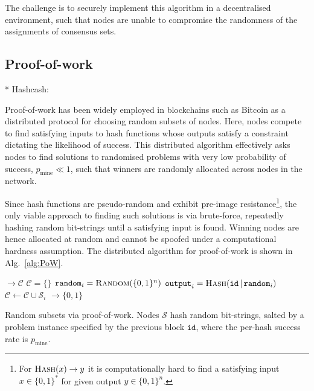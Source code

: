 \documentclass[twocolumn, aps, amsmath, amssymb, nofootinbib, superscriptaddress, longbibliography, floatfix, eqsecnum, rmp]{revtex4-2}
\let\oldalgorithmic\algorithmic
\let\endoldalgorithmic\endalgorithmic
\renewenvironment{algorithmic}
{\begin{adjustwidth}{-1em}{}\oldalgorithmic}
{\endoldalgorithmic\end{adjustwidth}}
\begin{document}
The challenge is to securely implement this algorithm in a decentralised environment, such that nodes are unable to compromise the randomness of the assignments of consensus sets.

\subsection{Proof-of-work} \label{sec:PoW}

* Hashcash: \cite{pow_email, hashcash}

Proof-of-work has been widely employed in blockchains such as Bitcoin \cite{Nakamoto08} as a distributed protocol for choosing random subsets of nodes. Here, nodes compete to find satisfying inputs to hash functions whose outputs satisfy a constraint dictating the likelihood of success. This distributed algorithm effectively asks nodes to find solutions to randomised problems with very low probability of success, $p_\mathrm{mine}\ll 1$, such that winners are randomly allocated across nodes in the network.

Since hash functions are pseudo-random and exhibit pre-image resistance\footnote{For $\textsc{Hash}(x)\to y$ it is computationally hard to find a satisfying input $x\in\{0,1\}^*$ for given output $y\in\{0,1\}^n$.}, the only viable approach to finding such solutions is via brute-force, repeatedly hashing random bit-strings until a satisfying input is found. Winning nodes are hence allocated at random and cannot be spoofed under a computational hardness assumption. The distributed algorithm for proof-of-work is shown in Alg.~\ref{alg:PoW}.

\begin{algorithm}[H]
\begin{algorithmic}
 $\to \mathcal{C}$
	\State $\mathcal{C} = \{\}$ 
	 
		\State $\mathtt{random}_i = \textsc{Random}(\{0,1\}^n)$
		\State $\mathtt{output}_i = \textsc{Hash}(\mathtt{id}\,|\,\mathtt{random}_i)$
			\State $\mathcal{C} \gets \mathcal{C} \cup \mathcal{S}_i$
		\EndIf
	\EndFor
	\EndWhile
	\State {}
\EndFunction
\State
{} $\to \{0,1\}$
		\State {}
	\Else
		\State {}
	\EndIf
\EndFunction
\end{algorithmic}
\caption{Random subsets via proof-of-work. Nodes $\mathcal{S}$ hash random bit-strings, salted by a problem instance specified by the previous block $\mathtt{id}$, where the per-hash success rate is $p_\mathrm{mine}$.} \label{alg:PoW}
\end{algorithm}
\end{document}
